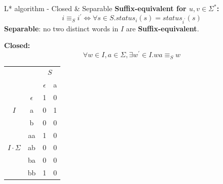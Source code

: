 \documentclass{beamer}
\begin{document}
\begin{frame}{L* algorithm - Closed \&  Separable}
\textbf{Suffix-equivalent for $u, v \in \Sigma^{*}$: }
$$
    i \equiv_{S} i^{\prime} \Leftrightarrow  \forall s \in S .status_i(s) = status_{i^{\prime}}(s)
$$
\textbf{\small Separable}: \small no two distinct words in $I$ are \textbf{Suffix-equivalent}. 


\textbf{Closed: }
$$
    \forall w \in I , a \in \Sigma, \exists w^{\prime} \in I.wa \equiv_{S} w
$$
        \centering
        \begin{tabular}{cc|c|c}
            &   & \multicolumn{2}{c}{$S$} \\ %
            \multicolumn{2}{c|}{} & $\epsilon$ & a \\ \hline
            & $\epsilon$ & 1 & 0 \\
            {$I$}& a          & 0 & 1 \\
            & b          & 0 & 0 \\ \hline
            
            & aa& 1& 0 \\
{$I \cdot \Sigma$}& ab& 0&0\\
            & ba         & 0 & 0 \\
            & bb         & 1 & 0 \\  
        \end{tabular}
\end{frame}
\end{document}
